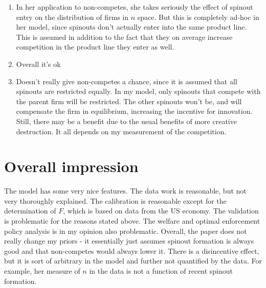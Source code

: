 \documentclass[12pt,english]{article}
\theoremstyle{remark}
\begin{document}
\begin{enumerate}
\begin{enumerate}
		\item In her application to non-competes, she takes seriously the effect of spinout entry on the distribution of firms in $n$ space. But this is completely ad-hoc in her model, since spinouts don't actually enter into the same product line. This is assumed in addition to the fact that they on average increase competition in the product line they enter as well. 
		\item Overall it's ok
		\item Doesn't really give non-competes a chance, since it is assumed that all spinouts are restricted equally. In my model, only spinouts that compete with the parent firm will be restricted. The other spinouts won't be, and will compensate the firm in equilibrium, increasing the incentive for innovation. Still, there may be a benefit due to the usual benefits of more creative destruction. It all depends on my measurement of the competition. 
	\end{enumerate}
\end{enumerate}

\section{Overall impression}

The model has some very nice features. The data work is reasonable, but not very thoroughly explained. The calibration is reasonable except for the determination of $F$, which is based on data from the US economy. The validation is problematic for the reasons stated above. The welfare and optimal enforcement policy analysis is in my opinion also problematic. Overall, the paper does not really change my priors - it essentially just assumes spinout formation is always good and that non-competes would always lower it. There is a disincentive effect, but it is sort of arbitrary in the model and further not quantified by the data. For example, her measure of $n$ in the data is not a function of recent spinout formation. 
\end{document}
